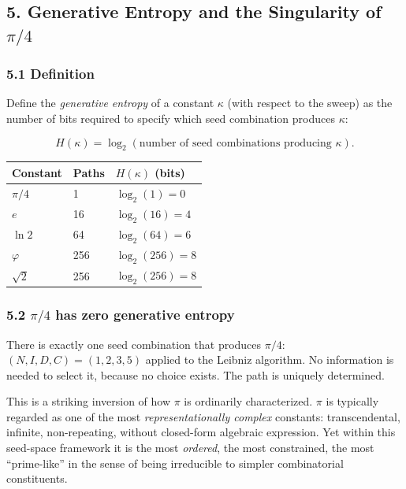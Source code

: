 \documentclass[
  11pt,
  letterpaper,
]{article}
\begin{document}
\subsection{\texorpdfstring{5. Generative Entropy and the Singularity of
\(\pi/4\)}{5. Generative Entropy and the Singularity of \textbackslash pi/4}}\label{generative-entropy-and-the-singularity-of-pi4}

\subsubsection{5.1 Definition}\label{definition}

Define the \emph{generative entropy} of a constant \(\kappa\) (with
respect to the sweep) as the number of bits required to specify which
seed combination produces \(\kappa\):

\[H(\kappa) = \log_2(\text{number of seed combinations producing } \kappa).
\]

\begin{longtable}[]{@{}lll@{}}
\toprule\noalign{}
Constant & Paths & \(H(\kappa)\) (bits) \\
\midrule\noalign{}
\endhead
\bottomrule\noalign{}
\endlastfoot
\(\pi/4\) & 1 & \(\log_2(1) = 0\) \\
\(e\) & 16 & \(\log_2(16) = 4\) \\
\(\ln 2\) & 64 & \(\log_2(64) = 6\) \\
\(\varphi\) & 256 & \(\log_2(256) = 8\) \\
\(\sqrt{2}\) & 256 & \(\log_2(256) = 8\) \\
\end{longtable}

\subsubsection{\texorpdfstring{5.2 \(\pi/4\) has zero generative
entropy}{5.2 \textbackslash pi/4 has zero generative entropy}}\label{pi4-has-zero-generative-entropy}

There is exactly one seed combination that produces \(\pi/4\):
\((N, I, D, C) = (1, 2, 3, 5)\) applied to the Leibniz algorithm. No
information is needed to select it, because no choice exists. The path
is uniquely determined.

This is a striking inversion of how \(\pi\) is ordinarily characterized.
\(\pi\) is typically regarded as one of the most
\emph{representationally complex} constants: transcendental, infinite,
non-repeating, without closed-form algebraic expression. Yet within this
seed-space framework it is the most \emph{ordered}, the most
constrained, the most ``prime-like'' in the sense of being irreducible
to simpler combinatorial constituents.
\end{document}
